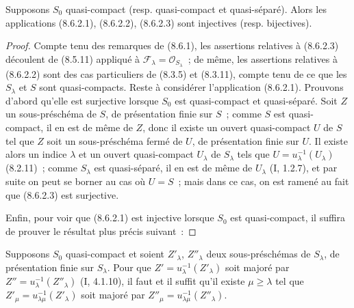 \begin{proposition}[8.6.3]
\label{IV.8.6.3-fr}
Supposons $S_0$ quasi-compact (resp. quasi-compact et quasi-séparé). Alors les
applications (8.6.2.1), (8.6.2.2), (8.6.2.3) sont injectives (resp.
bijectives).
\end{proposition}

\begin{proof}
Compte tenu des remarques de (8.6.1), les assertions relatives à (8.6.2.3)
découlent de (8.5.11) appliqué à $\mathcal F_\lambda=\mathcal O_{S_\lambda}$~;
de même, les assertions relatives à (8.6.2.2) sont des cas particuliers de
(8.3.5) et (8.3.11), compte tenu de ce que les $S_\lambda$ et $S$ sont
quasi-compacts. Reste à considérer l'application (8.6.2.1). Prouvons d'abord
qu'elle est surjective lorsque $S_0$ est quasi-compact et quasi-séparé. Soit
$Z$ un sous-préschéma de $S$, de présentation finie sur $S$~; comme $S$ est
quasi-compact, il en est de même de $Z$, donc il existe un ouvert
quasi-compact $U$ de $S$ tel que $Z$ soit un sous-préschéma fermé de $U$, de
présentation finie sur $U$. Il existe alors un indice $\lambda$ et un ouvert
quasi-compact $U_\lambda$ de $S_\lambda$ tels que
$U=u_\lambda^{-1}(U_\lambda)$ (8.2.11)~; comme $S_\lambda$ est quasi-séparé, il
en est de même de $U_\lambda$ (I, 1.2.7), et par suite on peut se borner au cas
où $U=S$~; mais dans ce cas, on est ramené au fait que (8.6.2.3) est
surjective.

Enfin, pour voir que (8.6.2.1) est injective lorsque $S_0$ est quasi-compact,
il suffira de prouver le résultat plus précis suivant~:
\end{proof}

\begin{corollary}[8.6.3.1]
\label{IV.8.6.3.1-fr}
Supposons $S_0$ quasi-compact et soient $Z'_\lambda$, $Z''_\lambda$ deux
sous-préschémas de $S_\lambda$, de présentation finie sur $S_\lambda$. Pour
que $Z'=u_\lambda^{-1}(Z'_\lambda)$ soit majoré par
$Z''=u_\lambda^{-1}(Z''_\lambda)$ (I, 4.1.10), il faut et il suffit qu'il
existe $\mu\geq\lambda$ tel que
$Z'_\mu=u_{\lambda\mu}^{-1}(Z'_\lambda)$ soit majoré par
$Z''_\mu=u_{\lambda\mu}^{-1}(Z''_\lambda)$.
\end{corollary}


